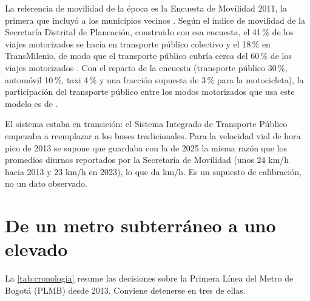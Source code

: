 La referencia de movilidad de la época es la Encuesta de Movilidad 2011, la primera que incluyó a los
municipios vecinos \citep{sdm2012}. Según el índice de movilidad de la Secretaría Distrital de
Planeación, construido con esa encuesta, el 41\,\% de los viajes motorizados se hacía en transporte
público colectivo y el 18\,\% en TransMilenio, de modo que el transporte público cubría cerca del 60\,\%
de los viajes motorizados \citep{sdp2013}. Con el reparto de la encuesta (transporte público 30\,\%,
automóvil 10\,\%, taxi 4\,\% y una fracción supuesta de 3\,\% para la motocicleta), la participación
del transporte público entre los modos motorizados que usa este modelo es de \PartTPDosMilTrece{}.

El sistema estaba en transición: el Sistema Integrado de Transporte Público empezaba a reemplazar a
los buses tradicionales. Para la velocidad vial de hora pico de 2013 se supone que guardaba con la de
2025 la misma razón que los promedios diurnos reportados por la Secretaría de Movilidad (unos 24 km/h
hacia 2013 y 23 km/h en 2023), lo que da \VelDosMilTrece{} km/h. Es un supuesto de calibración, no un
dato observado.

\section{De un metro subterráneo a uno elevado}

La \cref{tab:cronologia} resume las decisiones sobre la Primera Línea del Metro de Bogotá (PLMB) desde
2013. Conviene detenerse en tres de ellas.

